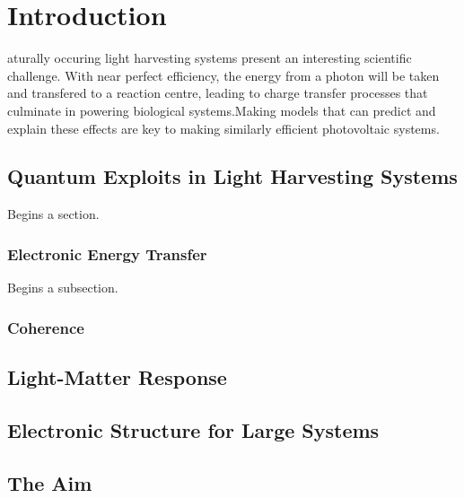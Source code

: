 %
%
\let\textcircled=\pgftextcircled
\chapter{Introduction}
\label{chap:intro}

aturally occuring light harvesting systems present an interesting 
scientific challenge. With near perfect efficiency, the energy from a photon
will be taken and transfered to a reaction centre, leading to charge transfer 
processes that culminate in powering biological systems.Making models that 
can predict and explain these effects are key to making similarly efficient 
photovoltaic systems.

\section{Quantum Exploits in Light Harvesting Systems}
\label{sec:sec01}

Begins a section.

\subsection{Electronic Energy Transfer}
\label{subsec:subsec01}

Begins a subsection.

\subsection{Coherence}
\label{subsec:subsec02}

\section{Light-Matter Response}
\label{sec:sec02}

\section{Electronic Structure for Large Systems}
\label{sec:sec03}

\section{The Aim}
\label{sec:sec04}

